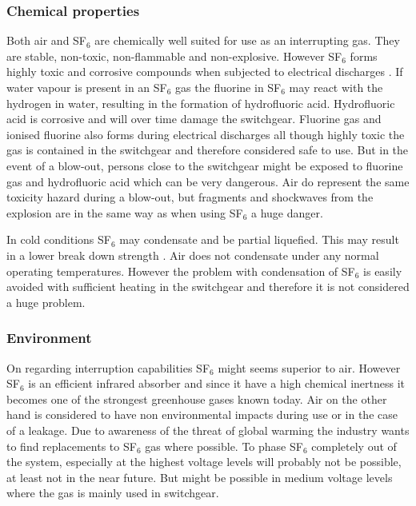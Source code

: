\documentclass[10pt,a4paper]{article} %
\begin{document}
\subsubsection*{Chemical properties}
Both air and SF$_6$ are chemically well suited for use as an interrupting gas. They are stable, non-toxic, non-flammable and non-explosive. However SF$_6$ forms highly toxic and corrosive compounds when subjected to electrical discharges \cite{bib:SF6PI}. If water vapour is present in an SF$_6$ gas the fluorine in SF$_6$ may react with the hydrogen in water, resulting in the formation of hydrofluoric acid. Hydrofluoric acid is corrosive and will over time damage the switchgear. Fluorine gas and ionised fluorine also forms during electrical discharges all though highly toxic the gas is contained in the switchgear and therefore considered safe to use. But in the event of a blow-out, persons close to the switchgear might be exposed to fluorine gas and hydrofluoric acid which can be very dangerous. Air do represent the same toxicity hazard during a blow-out, but fragments and shockwaves from the explosion are in the same way as when using SF$_6$ a huge danger.

In cold conditions SF$_6$ may condensate and be partial liquefied. This may result in a lower break down strength \cite{bib:SF6PI}. Air does not condensate under any normal operating temperatures. However the problem with condensation of SF$_6$ is easily avoided with sufficient heating in the switchgear and therefore it is not considered a huge problem.

\subsubsection*{Environment}
On regarding interruption capabilities SF$_6$ might seems superior to air. However SF$_6$ is an efficient infrared absorber and since it have a high chemical inertness it becomes one of the strongest greenhouse gases known today. Air on the other hand is considered to have non environmental impacts during use or in the case of a leakage. Due to awareness of the threat of global warming the industry wants to find replacements to SF$_6$ gas where possible. To phase SF$_6$ completely out of the system, especially at the highest voltage levels will probably not be possible, at least not in the near future. But might be possible in medium voltage levels where the gas is mainly used in switchgear.
\end{document}
